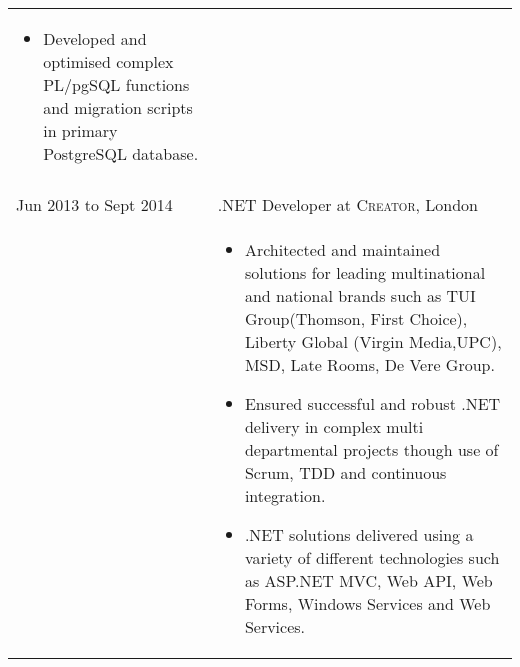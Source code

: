 \documentclass[a4paper,10pt]{article} %
\begin{document}
\begin{tabular}{ L{2cm} | L{11cm}}
\begin{itemize}[leftmargin=*]
		\item Developed and optimised complex PL/pgSQL functions and migration scripts in primary PostgreSQL database. 
			
	\end{itemize} \\
   
    
 
 \\






Jun 2013 to Sept 2014 & .NET Developer at \textsc{Creator}, London \\

 


 
&\MPtrue	   
	\begin{itemize}[leftmargin=*]
 
 
 
  
		\item Architected and maintained solutions for leading multinational and national brands such as TUI Group(Thomson, First Choice), Liberty Global (Virgin Media,UPC), MSD, Late Rooms, De Vere Group.

		\item Ensured successful and robust .NET delivery in complex multi departmental projects though use of Scrum, TDD and continuous integration. 

		\item .NET solutions delivered using a variety of different technologies such as ASP.NET MVC, Web API, Web Forms, Windows Services and Web Services. 
		

\end{itemize}
\end{tabular}
\end{document}
